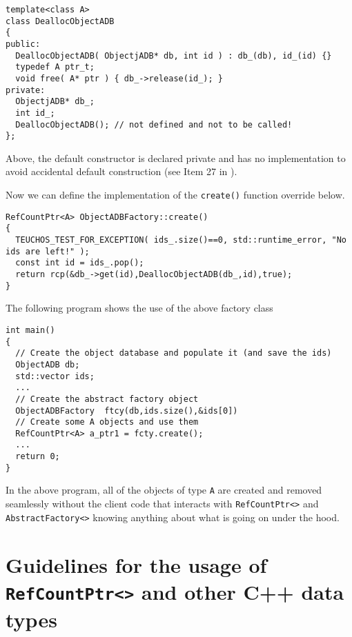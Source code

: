 {\scriptsize\begin{verbatim}
template<class A>
class DeallocObjectADB
{
public:
  DeallocObjectADB( ObjectjADB* db, int id ) : db_(db), id_(id) {}
  typedef A ptr_t;
  void free( A* ptr ) { db_->release(id_); }
private:
  ObjectjADB* db_;
  int id_;
  DeallocObjectADB(); // not defined and not to be called!
};
\end{verbatim}}

{}\noindent{}Above, the default constructor is declared private and
has no implementation to avoid accidental default construction (see
Item 27 in {}\cite{ref:meyers_1994}).

Now we can define the implementation of the {}\texttt{create()} function
override below.

{\scriptsize\begin{verbatim}
RefCountPtr<A> ObjectADBFactory::create()
{
  TEUCHOS_TEST_FOR_EXCEPTION( ids_.size()==0, std::runtime_error, "No ids are left!" );
  const int id = ids_.pop();
  return rcp(&db_->get(id),DeallocObjectADB(db_,id),true);
}
\end{verbatim}}

The following program shows the use of the above factory class

{\scriptsize\begin{verbatim}
int main()
{
  // Create the object database and populate it (and save the ids)
  ObjectADB db;
  std::vector ids;
  ...
  // Create the abstract factory object
  ObjectADBFactory  ftcy(db,ids.size(),&ids[0])
  // Create some A objects and use them
  RefCountPtr<A> a_ptr1 = fcty.create();
  ...
  return 0;
}
\end{verbatim}}

In the above program, all of the objects of type {}\texttt{A} are
created and removed seamlessly without the client code that interacts
with {}\texttt{Ref\-Count\-Ptr<>} and {}\texttt{AbstractFactory<>}
knowing anything about what is going on under the hood.

%
\section{Guidelines for the usage of {}\texttt{Ref\-Count\-Ptr<>} and other C++ data types}
%

